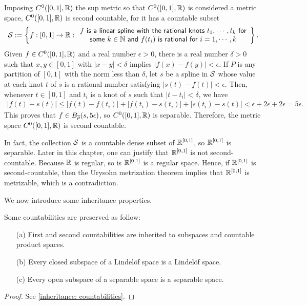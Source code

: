 \begin{exmp}
    Imposing $C^0([0, 1], {\mathbb{R}})$ the sup metric so that $C^0([0, 1], {\mathbb{R}})$ is considered a metric space, $C^0([0, 1], {\mathbb{R}})$ is second countable, for it has a countable subset
    \begin{align*}
        {\mathcal{S}}:=\left\{f: [0, 1]\rightarrow{\mathbb{R}}:
        \begin{array}{c}
            \textsf{$f$ is a linear spline with the rational knots $t_1, \cdots, t_k$ for}\\
            \textsf{some $k\in{\mathbb{N}}$ and $f(t_i)$ is rational for $i=1, \cdots, k$}
        \end{array}    
        \right\}.
    \end{align*}
    Given $f\in C^0([0, 1], {\mathbb{R}})$ and a real number $\epsilon>0$, there is a real number $\delta>0$ such that $x, y\in [0, 1]$ with $|x-y|<\delta$ implies $|f(x)-f(y)|<\epsilon$.
    If $P$ is any partition of $[0, 1]$ with the norm less than $\delta$, let $s$ be a spline in ${\mathcal{S}}$ whose value at each knot $t$ of $s$ is a rational number satisfying $|s(t)-f(t)|<\epsilon$.
    Then, whenever $t\in [0, 1]$ and $t_i$ is a knot of $s$ such that $|t-t_i|<\delta$, we have
    \begin{align*}
        |f(t)-s(t)| \leq |f(t)-f(t_i)| + |f(t_i)-s(t_i)| + |s(t_i)-s(t)| < \epsilon + 2\epsilon + 2\epsilon = 5\epsilon.
    \end{align*}
    This proves that $f\in B_{\overline{\rho}}(s, 5\epsilon)$, so $C^0([0, 1], {\mathbb{R}})$ is separable.
    Therefore, the metric space $C^0([0, 1], {\mathbb{R}})$ is second countable.

    In fact, the collection ${\mathcal{S}}$ is a countable dense subset of ${\mathbb{R}}^{[0, 1]}$, so ${\mathbb{R}}^{[0, 1]}$ is separable.
    Later in this chapter, one can justify that ${\mathbb{R}}^{[0, 1]}$ is not second-countable.
    Because ${\mathbb{R}}$ is regular, so is ${\mathbb{R}}^{[0, 1]}$ is a regular space.
    Hence, if ${\mathbb{R}}^{[0, 1]}$ is second-countable, then the Urysohn metrization theorem implies that ${\mathbb{R}}^{[0, 1]}$ is metrizable, which is a contradiction.
\end{exmp}

We now introduce some inheritance properties.
\begin{prop}\label{inheritance of countabilities}
    Some countabilities are preserved as follow:
    \begin{enumerate}
        \item[(a)]
        {
            First and second countabilities are inherited to subspaces and countable product spaces.
        }
        \item[(b)]
        {
            Every closed subspace of a Lindel\"{o}f space is a Lindel\"{o}f space.
        }
        \item[(c)]
        {
            Every open subspace of a separable space is a separable space.
        }
    \end{enumerate}
\end{prop}
\begin{proof}
    See \cref{inheritance: countabilities}.
\end{proof}

